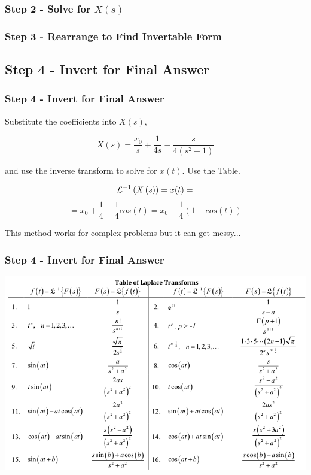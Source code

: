 \documentclass[fleqn]{beamer} %
\newcommand{\sectionIIsubsectionIItitle}{Step 2 - Solve for $X(s)$}
\newcommand{\sectionIIsubsectionIIItitle}{Step 3 - Rearrange to Find Invertable Form}
\newcommand{\sectionIIsubsectionIVtitle}{Step 4 - Invert for Final Answer}
\begin{document}
			\begin{frame}
				\frametitle{\sectionIIsubsectionIItitle}
				\bigskip

				
				
				\btVFill 
			\end{frame}	


			\begin{frame}
				\frametitle{\sectionIIsubsectionIIItitle}
				\bigskip

				
				\btVFill 
			\end{frame}

			
		\subsection{\sectionIIsubsectionIVtitle}\label{sectionIIsubsectionIV}

			\begin{frame}
				\frametitle{\sectionIIsubsectionIVtitle}
				\bigskip
				Substitute the coefficients into $X(s)$,

				\[ X(s) =\frac{x_0}{s}+\frac{1}{4s}-\frac{s}{4\left(s^2+1\right)} \]

				and use the inverse transform to solve for $x(t)$. Use the Table.

				\[ \Lagr^{-1} \left( X\left( s\right)\right)=x(t)= \]
				\[ = x_0+\frac{1}{4}-\frac{1}{4}cos\left(t\right)=x_0+\frac{1}{4}\left(1-cos\left(t\right) \right) \]

				This method works for complex problems but it can get messy...	
			
				\btVFill 
			\end{frame}	

			\begin{frame}
				\frametitle{\sectionIIsubsectionIVtitle}
				\bigskip
				
				\includegraphics[scale=.35]{images/laplace_table_part1.png}

				\btVFill 
			\end{frame}	
\end{document}
